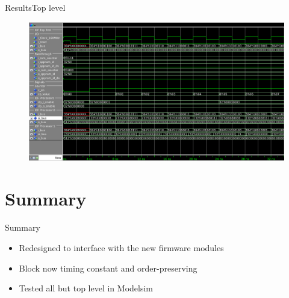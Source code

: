 \documentclass{beamer}
\begin{document}
\begin{frame}{Results}{Top level}
  \begin{figure}
    \begin{center}
      \includegraphics[height=0.6\textheight]{figs/top-test}
    \end{center}
  \end{figure}
\end{frame}

\section{Summary}
\begin{frame}{Summary}
  \begin{itemize}
  \item
    Redesigned to interface with the new firmware modules
  \item
    Block now timing constant and order-preserving
  \item
    Tested all but top level in Modelsim
  \end{itemize}
\end{frame}
\end{document}
